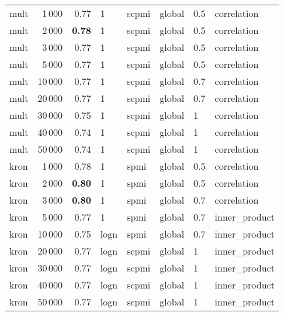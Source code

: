 \begin{tabular}{lrrlllll}
    mult &            1\,000 &  0.77 &     1 &  scpmi &  global &  0.5 &    correlation \\
    mult &            2\,000 &  \textbf{0.78} &     1 &  scpmi &  global &  0.5 &    correlation \\
    mult &            3\,000 &  0.77 &     1 &  scpmi &  global &  0.5 &    correlation \\
    mult &            5\,000 &  0.77 &     1 &  scpmi &  global &  0.5 &    correlation \\
    mult &           10\,000 &  0.77 &     1 &  scpmi &  global &  0.7 &    correlation \\
    mult &           20\,000 &  0.77 &     1 &  scpmi &  global &  0.7 &    correlation \\
    mult &           30\,000 &  0.75 &     1 &  scpmi &  global &    1 &    correlation \\
    mult &           40\,000 &  0.74 &     1 &  scpmi &  global &    1 &    correlation \\
    mult &           50\,000 &  0.74 &     1 &  scpmi &  global &    1 &    correlation \\ \addlinespace
    kron &            1\,000 &  0.78 &     1 &   spmi &  global &  0.5 &    correlation \\
    kron &            2\,000 &  \textbf{0.80} &     1 &   spmi &  global &  0.5 &    correlation \\
    kron &            3\,000 &  \textbf{0.80} &     1 &   spmi &  global &  0.7 &    correlation \\
    kron &            5\,000 &  0.77 &     1 &   spmi &  global &  0.7 &  inner\_product \\
    kron &           10\,000 &  0.75 &  logn &   spmi &  global &  0.7 &  inner\_product \\
    kron &           20\,000 &  0.77 &  logn &  scpmi &  global &    1 &  inner\_product \\
    kron &           30\,000 &  0.77 &  logn &  scpmi &  global &    1 &  inner\_product \\
    kron &           40\,000 &  0.77 &  logn &  scpmi &  global &    1 &  inner\_product \\
    kron &           50\,000 &  0.77 &  logn &  scpmi &  global &    1 &  inner\_product \\
\bottomrule
\end{tabular}
